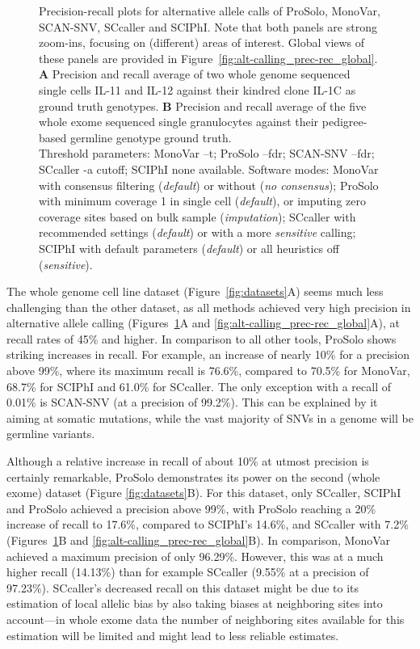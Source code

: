 \documentclass[fleqn,12pt,inline]{wlscirep}
\begin{document}
\begin{figure}[!tpb]
 \caption{
  Precision-recall plots for alternative allele calls of ProSolo, MonoVar, SCAN-SNV, SCcaller and SCIPhI.
  Note that both panels are strong zoom-ins, focusing on (different) areas of interest.
  Global views of these panels are provided in Figure~\ref{fig:alt-calling_prec-rec_global}.
  \textbf{A} Precision and recall average of two whole genome sequenced single cells IL-11 and IL-12 against their kindred clone IL-1C as ground truth genotypes.
  \textbf{B} Precision and recall average of the five whole exome sequenced single granulocytes against their pedigree-based germline genotype ground truth.\\
  Threshold parameters:
  MonoVar {\ttfamily --t};
  ProSolo {\ttfamily --fdr};
  SCAN-SNV {\ttfamily --fdr};
  SCcaller {\ttfamily -a cutoff};
  SCIPhI {\ttfamily none available}.
  Software modes:
  MonoVar with consensus filtering ({\itshape default}) or without ({\itshape no consensus});
  ProSolo with minimum coverage 1 in single cell ({\itshape default}), or imputing zero coverage sites based on bulk sample ({\itshape imputation});
  SCcaller with recommended settings ({\itshape default}) or with a more {\itshape sensitive} calling;
  SCIPhI with default parameters ({\itshape default}) or all heuristics off ({\itshape sensitive}).
 }
\label{fig:alt-calling_prec-rec}
\end{figure}

The whole genome cell line dataset (Figure~\ref{fig:datasets}A) seems much less challenging than the other dataset, as all methods achieved very high precision in alternative allele calling (Figures~\ref{fig:alt-calling_prec-rec}A and \ref{fig:alt-calling_prec-rec_global}A), at recall rates of 45\% and higher. 
In comparison to all other tools, ProSolo shows striking increases in recall.
For example, an increase of nearly 10\% for a precision above 99\%, where its maximum recall is 76.6\%, compared to 70.5\% for MonoVar, 68.7\% for SCIPhI and 61.0\% for SCcaller.
The only exception with a recall of 0.01\% is SCAN-SNV (at a precision of 99.2\%).
This can be explained by it aiming at somatic mutations, while the vast majority of SNVs in a genome will be germline variants.

Although a relative increase in recall of about 10\% at utmost precision is certainly remarkable, ProSolo demonstrates its power on the second (whole exome) dataset (Figure \ref{fig:datasets}B).
For this dataset, only SCcaller, SCIPhI and ProSolo achieved a precision above 99\%, with ProSolo reaching a 20\% increase of recall to 17.6\%, compared to SCIPhI's 14.6\%, and SCcaller with 7.2\% (Figures~\ref{fig:alt-calling_prec-rec}B and \ref{fig:alt-calling_prec-rec_global}B).
In comparison, MonoVar achieved a maximum precision of only 96.29\%. However, this was at a much higher recall (14.13\%) than for example SCcaller (9.55\% at a precision of 97.23\%).
SCcaller's decreased recall on this dataset might be due to its estimation of local allelic bias by also taking biases at neighboring sites into account---in whole exome data the number of neighboring sites available for this estimation will be limited and might lead to less reliable estimates.
\end{document}
